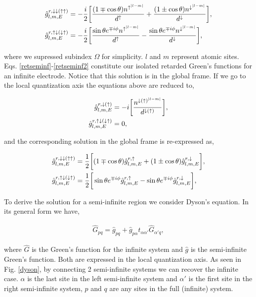 \documentclass[10pt,prb,showpacs,amssymb,floatfix]{revtex4-1}
\newcommand{\dna}{\downarrow}
\newcommand{\upa}{\uparrow}
\newcommand{\alp}{\alpha}
\newcommand{\Og}{\Omega}
\newcommand{\h}{\hat}
\begin{document}
\begin{align}
\label{retseminf}
\hat{g}^{r, \dna\dna (\upa\upa)}_{l,m,E} &=  -\frac{i}{2} \bigg{[}   \frac{(1\mp\cos\theta) n^{\upa^{|l-m|}}}{d^\upa } + \frac{(1\pm\cos\theta) n^{\dna^{|l-m|}}}{d^\dna } \bigg{]},  \\
\hat{g}^{r, \upa\dna(\dna\upa)}_{l, m, E}  &= -\frac{i}{2} \bigg{[}\frac{ \sin\theta e^{\mp i\phi} n^{\upa^{|l-m|}}}{d^\upa }   - \frac{ \sin\theta e^{\mp i\phi} n^{\dna^{|l-m|}}}{ d^\dna}\bigg{]},
\label{retseminf2}
\end{align}

where we supressed subindex $\Og$ for simplicity. $l$ and $m$ represent atomic sites. Eqs. \eqref{retseminf}-\eqref{retseminf2} constitute our isolated retarded Green's functions for an infinite electrode. Notice that this solution is in the global frame. If we go to the local quantization axis the equations above are reduced to,

\begin{align}
\label{retseminflocal}
\hat{g}^{r, \dna (\upa)}_{l,m,E} &=  -i \bigg{[}   \frac{ n^{\dna(\upa)^{|l-m|}}}{d^{\dna(\upa)} } \bigg{]},  \\
\hat{g}^{r, \upa\dna(\dna\upa)}_{l, m, E}  &= 0,
\label{retseminf2local}
\end{align}

and the corresponding solution in the global frame is re-expressed as,

\begin{align}
\label{retseminfother}
\hat{g}^{r, \dna\dna (\upa\upa)}_{l,m,E} &=  \frac{1}{2} \bigg{[}   (1\mp\cos\theta) \hat{g}^{r, \upa}_{l,m,E}+  (1\pm\cos\theta) \hat{g}^{r,\dna}_{l,m,E} \bigg{]},  \\
\hat{g}^{r, \upa\dna(\dna\upa)}_{l, m, E}  &= \frac{1}{2} \bigg{[}  \sin\theta e^{\mp i\phi}\hat{g}^{r,\upa}_{l,m,E}   -  \sin\theta e^{\mp i\phi} \hat{g}^{r,\dna}_{l,m,E} \bigg{]},
\label{retseminf2other}
\end{align}

To derive the solution for a semi-infinite region we consider Dyson's equation. In its general form we have,

\begin{align}
\h G_{pq} = \h g_{pq} + \h g_{p\alp} t_{\alp\alp'} \h G_{\alp'q},
\label{dysonseminf}
\end{align}

where $\h G$ is the Green's function for the infinite system and $\h g$ is the semi-infinite Green's function. Both are expressed in the local quantization axis. As seen in Fig. \ref{dyson}, by connecting 2 semi-infinite systems we can recover the infinite case. $\alp$ is the last site in the left semi-infinite system and $\alp'$ is the first site in the right semi-infinite system, $p$ and $q$ are any sites in the full (infinite) system.
\end{document}
